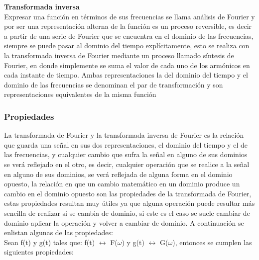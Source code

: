
\noindent
\textbf{Transformada inversa}\\
\indent
Expresar una funci\'on en t\'erminos de sus frecuencias se llama an\'alisis de Fourier y por ser una representaci\'on alterna de la funci\'on es un proceso reversible, es decir a partir de una serie de Fourier que se encuentra en el dominio de las frecuencias, siempre se puede pasar al dominio del tiempo expl\'icitamente, esto se realiza con la transformada inversa de Fourier mediante un proceso llamado s\'intesis de Fourier, en donde simplemente se suma el valor de cada uno de los arm\'onicos en cada instante de tiempo. Ambas representaciones la del dominio del tiempo y el dominio de las frecuencias se denominan el par de transformaci\'on y son representaciones equivalentes de la misma funci\'on \cite{ellis} 


\subsubsection{Propiedades}
La transformada de Fourier y la transformada inversa de Fourier es la relaci\'on que guarda una señal en sus dos representaciones, el dominio del tiempo y el de las frecuencias, y cualquier cambio que sufra la señal en alguno de sus dominios se ver\'a reflejado en el otro, es decir, cualquier operaci\'on que se realice a la señal en alguno de sus dominios, se ver\'a reflejada de alguna forma en el dominio opuesto, la relaci\'on en que un cambio matem\'atico en un dominio produce un cambio en el dominio opuesto son las propiedades de la transformada de Fourier, estas propiedades resultan muy \'utiles ya que alguna operaci\'on puede resultar m\'as sencilla de realizar si se cambia de dominio, si este es el caso se suele cambiar de dominio aplicar la operaci\'on y volver a cambiar de dominio. A continuaci\'on se enlistan algunas de las propiedades:\\ 

Sean f(t) y g(t) tales que: f(t) $\longleftrightarrow$ F($\omega$) y g(t) $\longleftrightarrow$ G($\omega$), entonces se cumplen las siguientes propiedades:\\

